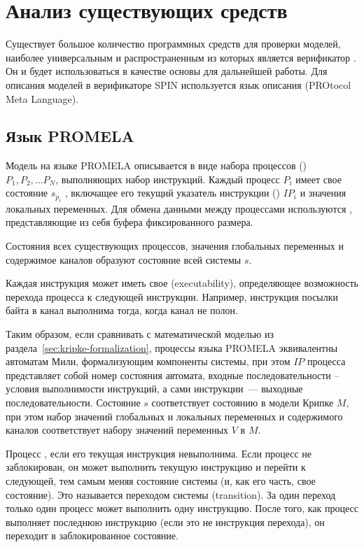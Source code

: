 \chapter{Анализ существующих средств}
\label{cha:analogues}

Существует большое количество программных средств для проверки моделей, наиболее
универсальным и распространенным из которых является верификатор 
\cite{SpinRoot}. Он и будет использоваться в качестве основы для дальнейшей работы. Для
описания моделей в верификаторе SPIN используется язык описания  (PROtocol
  Meta Language).

\section{Язык PROMELA}
\label{sec:promela}

Модель на языке PROMELA описывается в виде набора процессов () $P_1, P_2,
... P_N$, выполняющих набор инструкций. Каждый процесс $P_i$ имеет свое состояние
$s_{p_i}$ , включащее его текущий указатель инструкции () $IP_i$
и значения локальных переменных. Для обмена данными между процессами используются
, представляющие из себя буфера фиксированного размера.

Состояния всех существующих процессов, значения глобальных переменных и содержимое каналов
образуют состояние всей системы $s$.

Каждая инструкция может иметь свое  (executability),
определяющее возможность перехода процесса к следующей инструкции. Например, инструкция
посылки байта в канал выполнима тогда, когда канал не полон.

Таким образом, если сравнивать с математической моделью из
раздела~\ref{sec:kripke-formalization}, процессы языка PROMELA эквивалентны автоматам
Мили, формализующим компоненты системы, при этом $IP$ процесса представляет собой номер
состояния автомата, входные последовательности -- условия выполнимости инструкций, а сами
инструкции~--- выходные последовательности. Состояние $s$ соответствует состоянию в модели
Крипке $M$, при этом набор значений глобальных и локальных переменных и содержимого
каналов соответствует набору значений переменных $V$ в $M$.

Процесс , если его текущая инструкция невыполнима. Если процесс не
заблокирован, он может выполнить текущую инструкцию и перейти к следующей, тем самым меняя
состояние системы (и, как его часть, свое состояние). Это называется переходом системы
(transition). За один переход только один процесс может выполнить одну инструкцию. После
того, как процесс выполняет последнюю инструкцию (если это не инструкция перехода), он
переходит в заблокированное состояние.

